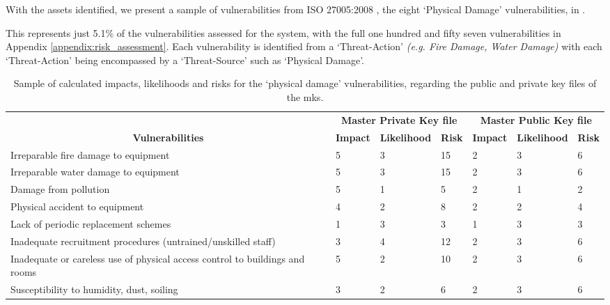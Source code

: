 With the assets identified, we present a sample of vulnerabilities from ISO 27005:2008 \citep{ISO2008}, the eight `Physical Damage' vulnerabilities, in .

This represents just 5.1\% of the vulnerabilities assessed for the \theResServer system, with the full one hundred and fifty seven vulnerabilities in Appendix \ref{appendix:risk_assessment}. Each vulnerability is identified from a `Threat-Action' \textit{(e.g. Fire Damage, Water Damage)} with each `Threat-Action' being encompassed by a `Threat-Source' such as `Physical Damage'.

\begin{table}[htp]
  \begin{tabularx}{\linewidth}{Xllllll}
    \rowcolor[HTML]{9BC1E6}
    \multicolumn{1}{c}{\cellcolor[HTML]{8497B0}} & \multicolumn{3}{c}{\cellcolor[HTML]{9BC1E6}\textbf{Master Private Key file}} & \multicolumn{3}{c}{\cellcolor[HTML]{9BC1E6}\textbf{Master Public Key file}} \\
    \multicolumn{1}{c}{\multirow{-2}{*}{\cellcolor[HTML]{8497B0}\textbf{Vulnerabilities}}} & \cellcolor[HTML]{D87B79}\textbf{Impact} & \cellcolor[HTML]{C6E0B4}\textbf{Likelihood} & \cellcolor[HTML]{8EA9DB}\textbf{Risk} & \cellcolor[HTML]{D87B79}\textbf{Impact} & \cellcolor[HTML]{C6E0B4}\textbf{Likelihood} & \cellcolor[HTML]{8EA9DB}\textbf{Risk} \\
    \cellcolor[HTML]{A9D08E}Irreparable fire damage to equipment & 5 & 3 & \cellcolor[HTML]{FDBB7B}15 & 2 & 3 & \cellcolor[HTML]{A3C37C}6 \\
    \rowcolor[HTML]{EFEFEF}
    \cellcolor[HTML]{A9D08E}Irreparable water damage to equipment & 5 & 3 & \cellcolor[HTML]{FDBB7B}15 & 2 & 3 & \cellcolor[HTML]{A3C37C}6 \\
    \cellcolor[HTML]{A9D08E}Damage from pollution & 5 & 1 & \cellcolor[HTML]{96C27C}5 & 2 & 1 & \cellcolor[HTML]{6FBF7B}2 \\
    \rowcolor[HTML]{EFEFEF}
    \cellcolor[HTML]{A9D08E}Physical accident to equipment & 4 & 2 & \cellcolor[HTML]{BCC57C}8 & 2 & 2 & \cellcolor[HTML]{88C17B}4 \\
    \cellcolor[HTML]{A9D08E}Lack of periodic replacement schemes & 1 & 3 & \cellcolor[HTML]{7CC07B}3 & 1 & 3 & \cellcolor[HTML]{7CC07B}3 \\
    \rowcolor[HTML]{EFEFEF}
    \cellcolor[HTML]{A9D08E}Inadequate recruitment procedures (untrained/unskilled staff) & 3 & 4 & \cellcolor[HTML]{F0C97D}12 & 2 & 3 & \cellcolor[HTML]{A3C37C}6 \\
    \cellcolor[HTML]{A9D08E}Inadequate or careless use of physical access control to buildings and rooms & 5 & 2 & \cellcolor[HTML]{D6C77D}10 & 2 & 3 & \cellcolor[HTML]{A3C37C}6 \\
    \rowcolor[HTML]{EFEFEF}
    \cellcolor[HTML]{A9D08E}Susceptibility to humidity, dust, soiling & 3 & 2 & \cellcolor[HTML]{A3C37C}6 & 2 & 3 & \cellcolor[HTML]{A3C37C}6
  \end{tabularx}
  \caption{Sample of calculated impacts, likelihoods and risks for the `physical damage' vulnerabilities, regarding the public and private key files of the \acrfull{mks}.}
  \label{tab:example_vulns_risks}
\end{table}

